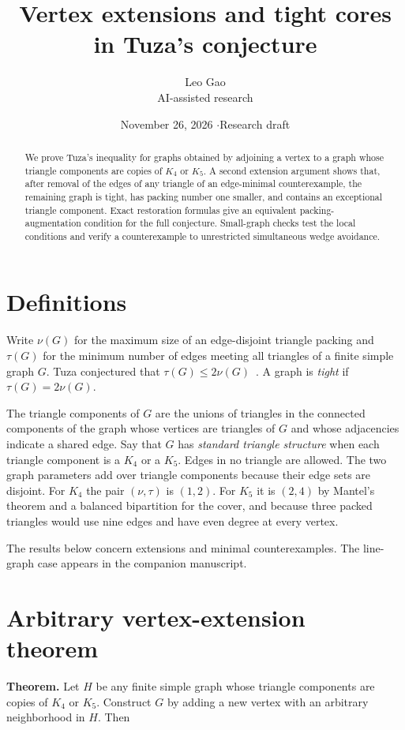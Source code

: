 \documentclass[11pt]{article}
\title{Vertex extensions and tight cores in Tuza's conjecture}
\author{Leo Gao\\[-1pt]{\small AI-assisted research}}
\date{November 26, 2026 \quad$\cdot$\quad Research draft}
\begin{document}
\maketitle
\begin{abstract}
We prove Tuza's inequality for graphs obtained by adjoining a vertex to a graph whose triangle components are copies of $K_4$ or $K_5$. A second extension argument shows that, after removal of the edges of any triangle of an edge-minimal counterexample, the remaining graph is tight, has packing number one smaller, and contains an exceptional triangle component. Exact restoration formulas give an equivalent packing-augmentation condition for the full conjecture. Small-graph checks test the local conditions and verify a counterexample to unrestricted simultaneous wedge avoidance.
\end{abstract}

\section{Definitions}

Write $\nu(G)$ for the maximum size of an edge-disjoint triangle packing and $\tau(G)$ for the minimum number of edges meeting all triangles of a finite simple graph $G$. Tuza conjectured that $\tau(G)\le2\nu(G)$~\cite{Tuza}. A graph is \emph{tight} if $\tau(G)=2\nu(G)$.

The triangle components of $G$ are the unions of triangles in the connected components of the graph whose vertices are triangles of $G$ and whose adjacencies indicate a shared edge. Say that $G$ has \emph{standard triangle structure} when each triangle component is a $K_4$ or a $K_5$. Edges in no triangle are allowed. The two graph parameters add over triangle components because their edge sets are disjoint. For $K_4$ the pair $(\nu,\tau)$ is $(1,2)$. For $K_5$ it is $(2,4)$ by Mantel's theorem and a balanced bipartition for the cover, and because three packed triangles would use nine edges and have even degree at every vertex.

The results below concern extensions and minimal counterexamples. The line-graph case appears in the companion manuscript.

\section{Arbitrary vertex-extension theorem}

\textbf{Theorem.} Let \(H\) be any finite simple graph whose triangle components are copies of \(K_4\) or \(K_5\). Construct \(G\) by adding a new vertex with an arbitrary neighborhood in \(H\). Then
\end{document}
